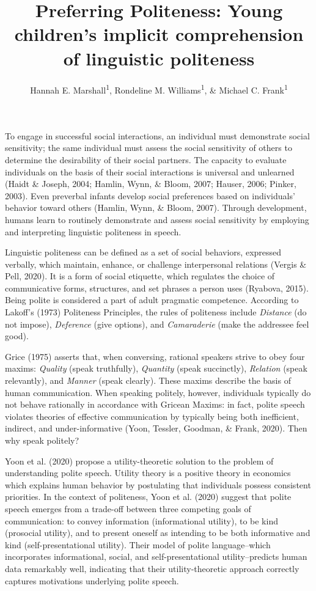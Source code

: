 \documentclass[
  english,
  man,floatsintext]{apa6}
\title{Preferring Politeness: Young children's implicit comprehension of linguistic politeness}
\author{Hannah E. Marshall\textsuperscript{1}, Rondeline M. Williams\textsuperscript{1}, \& Michael C. Frank\textsuperscript{1}}
\date{}
\affiliation{\vspace{0.5cm}\textsuperscript{1} Stanford University}
\begin{document}
\maketitle

To engage in successful social interactions, an individual must demonstrate social sensitivity; the same individual must assess the social sensitivity of others to determine the desirability of their social partners. The capacity to evaluate individuals on the basis of their social interactions is universal and unlearned (Haidt \& Joseph, 2004; Hamlin, Wynn, \& Bloom, 2007; Hauser, 2006; Pinker, 2003). Even preverbal infants develop social preferences based on individuals' behavior toward others (Hamlin, Wynn, \& Bloom, 2007). Through development, humans learn to routinely demonstrate and assess social sensitivity by employing and interpreting linguistic politeness in speech.

Linguistic politeness can be defined as a set of social behaviors, expressed verbally, which maintain, enhance, or challenge interpersonal relations (Vergis \& Pell, 2020). It is a form of social etiquette, which regulates the choice of communicative forms, structures, and set phrases a person uses (Ryabova, 2015). Being polite is considered a part of adult pragmatic competence. According to Lakoff's (1973) Politeness Principles, the rules of politeness include \emph{Distance} (do not impose), \emph{Deference} (give options), and \emph{Camaraderie} (make the addressee feel good).

Grice (1975) asserts that, when conversing, rational speakers strive to obey four maxims: \emph{Quality} (speak truthfully), \emph{Quantity} (speak succinctly), \emph{Relation} (speak relevantly), and \emph{Manner} (speak clearly). These maxims describe the basis of human communication. When speaking politely, however, individuals typically do not behave rationally in accordance with Gricean Maxims: in fact, polite speech violates theories of effective communication by typically being both inefficient, indirect, and under-informative (Yoon, Tessler, Goodman, \& Frank, 2020). Then why speak politely?

Yoon et al. (2020) propose a utility-theoretic solution to the problem of understanding polite speech. Utility theory is a positive theory in economics which explains human behavior by postulating that individuals possess consistent priorities. In the context of politeness, Yoon et al. (2020) suggest that polite speech emerges from a trade-off between three competing goals of communication: to convey information (informational utility), to be kind (prosocial utility), and to present oneself as intending to be both informative and kind (self-presentational utility). Their model of polite language--which incorporates informational, social, and self-presentational utility--predicts human data remarkably well, indicating that their utility-theoretic approach correctly captures motivations underlying polite speech.
\end{document}
